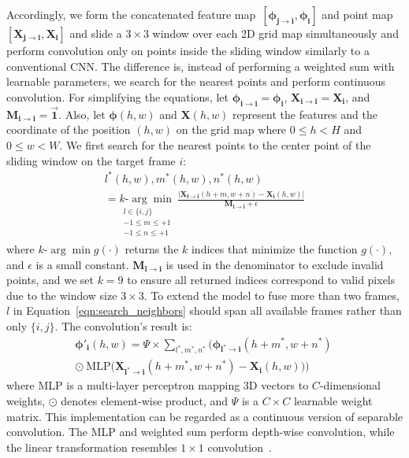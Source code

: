 Accordingly, we form the concatenated feature map~$[\boldsymbol{\phi_{j \rightarrow i}},\boldsymbol{\phi_{i}}]$ and point map~$[\boldsymbol{X_{j \rightarrow i}},\boldsymbol{X_{i}}]$ and slide a $3\times3$ window over each 2D grid map simultaneously and perform convolution only on points inside the sliding window similarly to a conventional CNN. The difference is, instead of performing a weighted sum with learnable parameters, we search for the nearest points and perform continuous convolution. For simplifying the equations, let $\boldsymbol{\phi_{i \rightarrow i}}=\boldsymbol{\phi_{i}}$, $\boldsymbol{X_{i \rightarrow i}}=\boldsymbol{X_{i}}$, and $\boldsymbol{M_{i \rightarrow i}}=\vec{\mathbf{1}}$. Also, let $\boldsymbol{\phi}(h,w)$ and $\boldsymbol{X}(h,w)$ represent the features and the coordinate of the position $(h,w)$ on the grid map where $0 \le h < H$ and $0 \le w < W$. We first search for the nearest points to the center point of the sliding window on the target frame $i$:
\begin{multline} \label{eqn:search_neighbors}
l^*(h,w),m^*(h,w),n^*(h,w) 
\\= \underset{\substack{l \in \{i,j\} \\ -1\le m \le +1 \\ -1 \le n \le +1}}{\textit{k-}\!\arg\min} \ 
\frac{\big| \boldsymbol{X_{l \rightarrow i}}(h+m,w+n) - \boldsymbol{X_{i}}(h,w)\big|}{\boldsymbol{M_{l \rightarrow i}} + \epsilon}
\end{multline}
where $\textit{k-}\!\arg\min g(\cdot)$ returns the $k$ indices that minimize the function $g(\cdot)$, and $\epsilon$ is a small constant. $\boldsymbol{M_{l \rightarrow i}}$ is used in the denominator to exclude invalid points, and we set $k=9$ to ensure all returned indices correspond to valid pixels due to the window size $3 \times 3$. To extend the model to fuse more than two frames, $l$ in Equation~\ref{eqn:search_neighbors} should span all available frames rather than only $\{i,j\}$. The convolution's result is:
\begin{multline}
\! \! \! \! \boldsymbol{\phi'_{i}}(h,w)= \Psi \times \! \! \! \! \sum_{l^*,m^*,n^*} \! \! \!
\Big( \! \boldsymbol{\phi_{l^* \rightarrow i}}(h+m^*,w+n^*) \ \\ \odot \ \text{MLP}\big(\boldsymbol{X_{l^* \rightarrow i}}(h+m^*,w+n^*) - \boldsymbol{X_{i}}(h,w)\big) \Big)
\end{multline}
where MLP is a multi-layer perceptron mapping 3D vectors to $C$-dimensional weights, $\odot$ denotes element-wise product, and $\Psi$ is a $C \times C$ learnable weight matrix. This implementation can be regarded as a continuous version of separable convolution. The MLP and weighted sum perform depth-wise convolution, while the linear transformation resembles $1 \times 1$ convolution~\cite{chen2019learning}.

